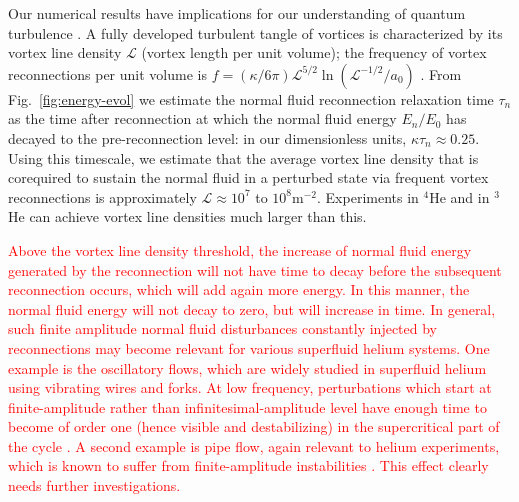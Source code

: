 \documentclass[9pt,twocolumn,twoside]{pnas-new}
\def\red#1{\textcolor{red}{#1}}
\begin{document}
Our numerical results have implications for our understanding of 
quantum turbulence \cite{BSS2023}.
A fully developed turbulent tangle of vortices is
characterized by its vortex line density $\mathcal{L}$ (vortex length
per unit volume); the frequency 
of vortex reconnections per unit volume is 
${f=(\kappa/6\pi)\mathcal{L}^{5/2}\ln(\mathcal{L}^{-1/2}/a_0)}$
\cite{barenghi2004}. From Fig.~\ref{fig:energy-evol} we estimate the 
normal fluid reconnection relaxation time $\tau_n$ as the time 
after reconnection at which the normal fluid energy $E_n/E_0$ has decayed
to the pre-reconnection level: in our dimensionless units, $\kappa \tau_n \approx 0.25$. 
Using this timescale, we estimate that
the average vortex line density that is corequired to sustain the normal fluid 
in a perturbed state via frequent vortex reconnections is approximately
$\mathcal{L} \approx 10^7$ to $10^8\mathrm{m}^{-2}$. 
Experiments in $^4$He
\cite{schwarz1981,milliken1982,roche2008,roche2007,Babuin2014} and in $^3$He
\cite{bradley2006} can achieve vortex line densities much larger than this.

\red{
Above the vortex line density threshold, the increase of normal fluid energy generated by the reconnection will not have time to decay before the subsequent reconnection occurs, which will add again more energy. In this manner, the normal fluid energy will not decay to zero, but will increase in time. In general, such finite amplitude normal fluid disturbances constantly injected by reconnections may become relevant for various superfluid helium systems. One example is the oscillatory flows, which are widely studied in superfluid helium using vibrating wires and forks. At low frequency, perturbations which start at finite-amplitude rather than infinitesimal-amplitude level have enough time to become of order one (hence visible and destabilizing) in the supercritical part of the cycle \cite{barenghi1989modulated}. A second example is pipe flow, again relevant to helium experiments, which is known to suffer from finite-amplitude instabilities \cite{peixinho2007finite}. This effect clearly needs further investigations.
}
\end{document}
